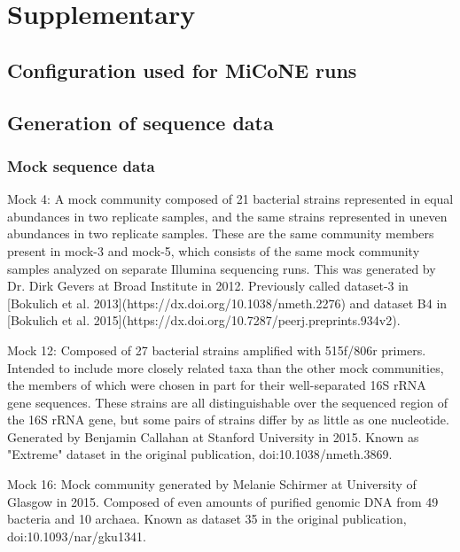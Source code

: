 
\newpage
\section*{Supplementary}

  \renewcommand{\thefigure}{S\arabic{figure}}
  \setcounter{figure}{0}

  \renewcommand{\thetable}{S\arabic{table}}
  \setcounter{table}{0}

  

  \subsection{Configuration used for MiCoNE runs}

  \subsection{Generation of sequence data}

  \subsubsection{Mock sequence data}
  Mock 4: A mock community composed of 21 bacterial strains represented in equal abundances in two replicate samples, and the same strains represented in uneven abundances in two replicate samples. These are the same community members present in mock-3 and mock-5, which consists of the same mock community samples analyzed on separate Illumina sequencing runs. This was generated by Dr. Dirk Gevers at Broad Institute in 2012. Previously called dataset-3 in [Bokulich et al. 2013](https://dx.doi.org/10.1038/nmeth.2276) and dataset B4 in [Bokulich et al. 2015](https://dx.doi.org/10.7287/peerj.preprints.934v2).

  Mock 12: Composed of 27 bacterial strains amplified with 515f/806r primers. Intended to include more closely related taxa than the other mock communities, the members of which were chosen in part for their well-separated 16S rRNA gene sequences. These strains are all distinguishable over the sequenced region of the 16S rRNA gene, but some pairs of strains differ by as little as one nucleotide. Generated by Benjamin Callahan at Stanford University in 2015. Known as "Extreme" dataset in the original publication, doi:10.1038/nmeth.3869.

  Mock 16: Mock community generated by Melanie Schirmer at University of Glasgow in 2015. Composed of even amounts of purified genomic DNA from 49 bacteria and 10 archaea. Known as dataset 35 in the original publication, doi:10.1093/nar/gku1341.

